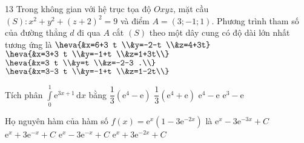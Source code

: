 \begin{ex}13%
Trong không gian với hệ trục tọa độ $Oxyz$, mặt cầu $(S)\colon x^{2}+y^{2}+(z+2)^{2}=9$ và điểm $A=(3 ;-1 ; 1)$. Phương trình tham số của đường thẳng $d$ đi qua $A$ cắt $(S)$ theo một dây cung có độ dài lớn nhất tương ứng là
\choice
{\True $\heva{&x=6+3 t \\&y=-2-t \\&z=4+3t}$}
{$\heva{&x=3+3 t \\&y=-1+t \\&z=1+3t\\}$}
{$\heva{&x=3 t \\&y=t \\&z=-2-3 .\\}$}
{$\heva{&x=3-3 t \\&y=-1+t \\&z=1-2t\\}$}

\end{ex}

\begin{ex}%
Tích phân $ \displaystyle\int\limits_{0}^{1}\mathrm{e}^{3x+1}\mathrm{\,d}x $ bằng
\choice
{\True $ \dfrac{1}{3}\left(\mathrm{e}^4-\mathrm{e}\right) $}
{$ \dfrac{1}{3}\left(\mathrm{e}^4+\mathrm{e}\right) $}
{$ \mathrm{e}^4-\mathrm{e} $}
{$ \mathrm{e}^3-\mathrm{e} $}
\end{ex}

\begin{ex}%
Họ nguyên hàm của hàm số $f(x)=\mathrm{e}^x(1-3 \mathrm{e}^{-2x})$ là
\choice
{$\mathrm{e}^x-3 \mathrm{e}^{-3x}+C$}
{\True $\mathrm{e}^x+3 \mathrm{e}^{-x}+C$}
{$\mathrm{e}^x-3 \mathrm{e}^{-x}+C$}
{$\mathrm{e}^x+3 \mathrm{e}^{-2x}+C$}
\end{ex}

